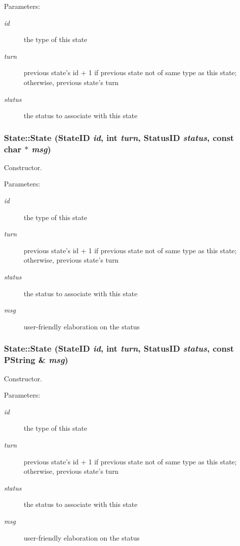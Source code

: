 \begin{Desc}
\item[Parameters:]
\begin{description}
\item[{\em id}]the type of this state \item[{\em turn}]previous state's id + 1 if previous state not of same type as this state; otherwise, previous state's turn \item[{\em status}]the status to associate with this state \end{description}
\end{Desc}
\hypertarget{classState_4ff7773f710d19259128cd975945b8d2}{
\subsubsection[{State}]{\setlength{\rightskip}{0pt plus 5cm}State::State ({\bf StateID} {\em id}, \/  int {\em turn}, \/  {\bf StatusID} {\em status}, \/  const char $\ast$ {\em msg})}}
\label{classState_4ff7773f710d19259128cd975945b8d2}


Constructor. 

\begin{Desc}
\item[Parameters:]
\begin{description}
\item[{\em id}]the type of this state \item[{\em turn}]previous state's id + 1 if previous state not of same type as this state; otherwise, previous state's turn \item[{\em status}]the status to associate with this state \item[{\em msg}]user-friendly elaboration on the status \end{description}
\end{Desc}
\hypertarget{classState_380fc79d928e017522e3b1c91e9aa66e}{
\subsubsection[{State}]{\setlength{\rightskip}{0pt plus 5cm}State::State ({\bf StateID} {\em id}, \/  int {\em turn}, \/  {\bf StatusID} {\em status}, \/  const PString \& {\em msg})}}
\label{classState_380fc79d928e017522e3b1c91e9aa66e}


Constructor. 

\begin{Desc}
\item[Parameters:]
\begin{description}
\item[{\em id}]the type of this state \item[{\em turn}]previous state's id + 1 if previous state not of same type as this state; otherwise, previous state's turn \item[{\em status}]the status to associate with this state \item[{\em msg}]user-friendly elaboration on the status \end{description}
\end{Desc}


